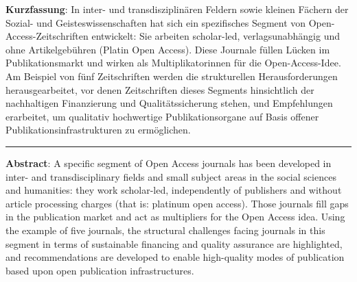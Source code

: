 \textbf{Kurzfassung}: In inter- und transdisziplinären Feldern sowie
kleinen Fächern der Sozial- und Geisteswissenschaften hat sich ein
spezifisches Segment von Open-Access-Zeitschriften entwickelt: Sie
arbeiten scholar-led, verlagsunabhängig und ohne Artikelgebühren (Platin
Open Access). Diese Journale füllen Lücken im Publikationsmarkt und
wirken als Multiplikatorinnen für die Open-Access-Idee. Am Beispiel von
fünf Zeitschriften werden die strukturellen Herausforderungen
herausgearbeitet, vor denen Zeitschriften dieses Segments hinsichtlich
der nachhaltigen Finanzierung und Qualitätssicherung stehen, und
Empfehlungen erarbeitet, um qualitativ hochwertige Publikationsorgane
auf Basis offener Publikationsinfrastrukturen zu ermöglichen.

\begin{center}\rule{0.5\linewidth}{\linethickness}\end{center}

\textbf{Abstract}: A specific segment of Open Access journals has been
developed in inter- and transdisciplinary fields and small subject areas
in the social sciences and humanities: they work scholar-led,
independently of publishers and without article processing charges (that
is: platinum open access). Those journals fill gaps in the publication
market and act as multipliers for the Open Access idea. Using the
example of five journals, the structural challenges facing journals in
this segment in terms of sustainable financing and quality assurance are
highlighted, and recommendations are developed to enable high-quality
modes of publication based upon open publication infrastructures.
